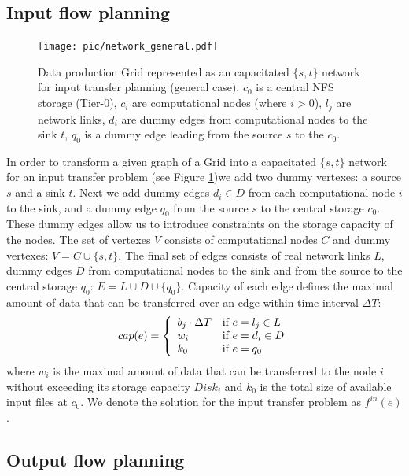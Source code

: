 \documentclass{svjour3}                     %
\begin{document}
\subsection{Input flow planning}
\begin{figure}[h]
	\begin{center}
		\texttt{[image: pic/network\_general.pdf]}
	\end{center}
	\caption{Data production Grid represented as an capacitated $\{s,t\}$ network for input transfer planning (general case). $c_{0}$ is a central NFS storage (Tier-0), $c_{i}$ are computational nodes (where $i>0$), $l_{j}$ are network links, $d_{i}$ are dummy edges from computational nodes to the sink $t$, $q_{0}$ is a dummy edge leading from the source $s$ to the $c_{0}$. }
	\label{network_general}
\end{figure}  
In order to transform a given graph of a Grid into a capacitated $\{s,t\}$
network for an input transfer problem (see Figure \ref{network_general})we add two dummy vertexes: a source $s$
and a sink $t$. Next we add  dummy edges $d_{i} \in D$ from each computational
node $i$ to the sink, and a dummy edge $q_{0}$ from the source $s$ to the
central storage $c_{0}$. These dummy edges allow us to introduce constraints
on the storage capacity of the nodes. The set of vertexes $V$ consists of
computational nodes $C$ and dummy vertexes: $V= C \cup \{s,t\}$. The final set
of edges consists of real network links $L$, dummy edges $D$ from
computational nodes to the sink and from the source to the central storage
$q_{0}$: $E= L \cup D \cup \{q_{0}\}$. Capacity of each edge defines the
maximal amount of data that can be transferred over an edge within time
interval $\Delta T$: 
%
\begin{equation} 
\label{edge_cap} 
cap(e) = \left\{
\begin{array}{l l} 
b_{j} \cdot \Delta T & \text{if }e = l_{j} \in L \\ w_{i} &
\text{if } e = d_{i} \in D\\ k_{0} & \text{if } e = q_{0} 
\end{array} \right.
\end{equation} 
%
where $w_{i}$ is the maximal amount of data that can be
transferred to the node $i$ without exceeding its storage capacity $Disk_{i}$
and $k_{0}$ is the total size of available input files at $c_{0}$. We denote
the solution for the input transfer problem as $f^{in}(e)$.

\subsection{Output flow planning}
\end{document}

